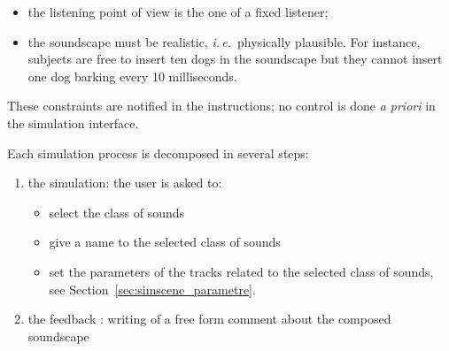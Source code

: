 \documentclass[12pt]{elsarticle}
\newcommand{\ie}{\emph{i.\,e.}}
\newcommand{\cf}{cf.}
\begin{document}
\begin{itemize}
\item the listening point of view is the one of a fixed listener;
\item the soundscape must be realistic, \ie~physically plausible. For instance, subjects are free to insert ten dogs in the soundscape but they cannot insert one dog barking every 10 milliseconds.
\end{itemize}


These constraints are notified in the instructions; no control is done \emph{a priori} in the simulation interface.

%

Each simulation process is decomposed in several steps:

\begin{enumerate}
\item the simulation: the user is asked to:
\begin{itemize}
  \item  select the class of sounds
	\item  give a name to the selected class of sounds
	\item  set the parameters of the tracks related to the selected class of sounds, see Section~\ref{sec:simscene_parametre}.
\end{itemize}
\item the feedback : writing of a free form comment about the composed soundscape
\end{enumerate}
\end{document}
